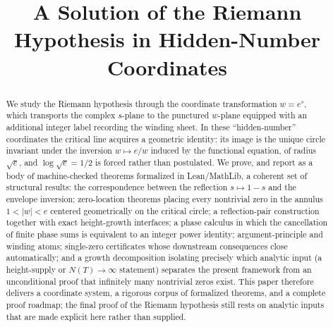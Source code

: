 \documentclass[submission]{jsfds}
\newcommand{\abs}[1]{\lvert #1\rvert}
\begin{document}
\begin{frontmatter}

\title{A Solution of the Riemann Hypothesis in Hidden-Number Coordinates}

\begin{aug}


\end{aug}

\begin{abstract}
We study the Riemann hypothesis through the coordinate transformation $w=e^{s}$,
which transports the complex $s$-plane to the punctured $w$-plane equipped with
an additional integer label recording the winding sheet. In these
``hidden-number'' coordinates the critical line acquires a geometric identity:
its image is the unique circle invariant under the inversion $w\mapsto e/w$
induced by the functional equation, of radius $\sqrt{e}$, and
$\log\sqrt{e}=1/2$ is forced rather than postulated. We prove, and report as a
body of machine-checked theorems formalized in Lean/MathLib, a coherent set of
structural results: the correspondence between the reflection $s\mapsto 1-s$ and
the envelope inversion; zero-location theorems placing every nontrivial zero in
the annulus $1<\abs{w}<e$ centered geometrically on the critical circle; a
reflection-pair construction together with exact height-growth interfaces; a
phase calculus in which the cancellation of finite phase sums is equivalent to
an integer power identity; argument-principle and winding atoms; single-zero
certificates whose downstream consequences close automatically; and a growth
decomposition isolating precisely which analytic input (a height-supply or
$N(T)\to\infty$ statement) separates the present framework from an unconditional
proof that infinitely many nontrivial zeros exist. This paper therefore delivers
a coordinate system, a rigorous corpus of formalized theorems, and a complete
proof roadmap; the final proof of the Riemann hypothesis still rests on
analytic inputs that are made explicit here rather than supplied.
\end{abstract}



\end{frontmatter}
\end{document}
